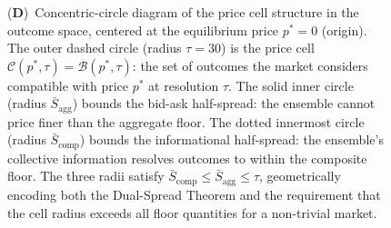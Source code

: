 \begin{figure}[!htbp]
{    (\textbf{D})~Concentric-circle diagram of the price cell structure in the outcome space, centered at the equilibrium price $p^* = 0$ (origin).  The outer dashed circle (radius $\tau = 30$) is the price cell $\mathcal{C}(p^*, \tau) = \mathcal{B}(p^*, \tau)$: the set of outcomes the market considers compatible with price $p^*$ at resolution $\tau$.  The solid inner circle (radius $\bar{S}_{\mathrm{agg}}$) bounds the bid-ask half-spread: the ensemble cannot price finer than the aggregate floor.  The dotted innermost circle (radius $\bar{S}_{\mathrm{comp}}$) bounds the informational half-spread: the ensemble's collective information resolves outcomes to within the composite floor.  The three radii satisfy $\bar{S}_{\mathrm{comp}} \leq \bar{S}_{\mathrm{agg}} \leq \tau$, geometrically encoding both the Dual-Spread Theorem and the requirement that the cell radius exceeds all floor quantities for a non-trivial market.}
    \label{fig:price_panel_3}
\end{figure}

